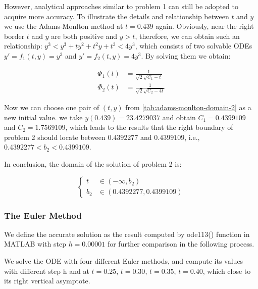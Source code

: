 \documentclass[a4paper]{article}
\begin{document}
	However, analytical approaches similar to problem 1 can still be adopted to acquire more accuracy. To illustrate the details and relationship between $t$ and $y$ we use the Adams-Monlton method at $t = 0.439$ again. Obviously, near the right border $t$ and $y$ are both positive and $y > t$, therefore, we can obtain such an relationship: $y^3 < y^3 + ty^2 +t^2y +t^3 < 4y^3$, which consists of two solvable ODEs $y' = f_1(t, y) = y^3$ and $y' = f_2(t, y) = 4y^3$. By solving them we obtain:
	
	\begin{align}
	    \Phi_1(t) &= \frac{1}{\sqrt{2}\sqrt{C_1 - t}} \\
	    \Phi_2(t) &= \frac{1}{\sqrt{2}\sqrt{C_2 - 4t}}
	\end{align}
	
	Now we can choose one pair of $(t, y)$ from \autoref{tab:adams-monlton-domain-2} as a new initial value. we take $y(0.439) = 23.4279037$ and obtain $C_1 = 0.4399109$ and $C_2 = 1.7569109$, which leads to the results that the right boundary of problem 2 should locate between $0.4392277$ and $0.4399109$, i.e., $0.4392277 < b_2 < 0.4399109$.
	
	In conclusion, the domain of the solution of problem 2 is:
	
	$$
	\left\{
    	\begin{aligned}
    	    t &\in (-\infty, b_2) \nonumber \\
    	    b_2 &\in (0.4392277, 0.4399109) \nonumber
    	\end{aligned}
	\right.
	$$


     \subsubsection{The Euler Method}

	We define the accurate solution as the result computed by ode113() function in MATLAB with step $h = 0.00001$ for further comparison in the following process. 
	
	We solve the ODE with four different Euler methods, and compute its values with different step h and at $t = 0.25$, $t = 0.30$, $t = 0.35$, $t = 0.40$, which close to its right vertical asymptote.
	
\end{document}
